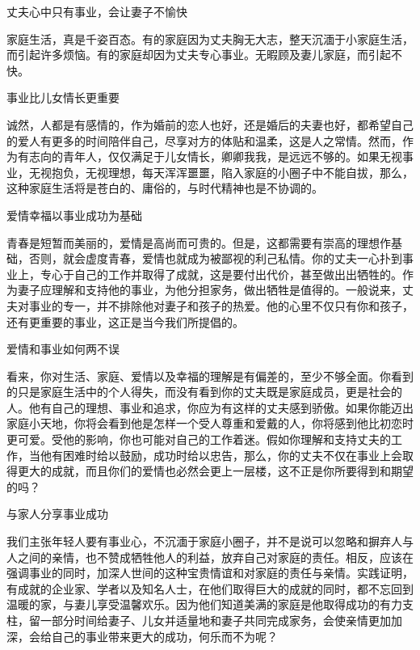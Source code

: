 \documentclass[12pt,UTF8]{ctexbook}
\begin{document}
丈夫心中只有事业，会让妻子不愉快


家庭生活，真是千姿百态。有的家庭因为丈夫胸无大志，整天沉湎于小家庭生活，而引起许多烦恼。有的家庭却因为丈夫专心事业。无暇顾及妻儿家庭，而引起不快。





事业比儿女情长更重要


诚然，人都是有感情的，作为婚前的恋人也好，还是婚后的夫妻也好，都希望自己的爱人有更多的时间陪伴自己，尽享对方的体贴和温柔，这是人之常情。然而，作为有志向的青年人，仅仅满足于儿女情长，卿卿我我，是远远不够的。如果无视事业，无视抱负，无视理想，每天浑浑噩噩，陷入家庭的小圈子中不能自拔，那么，这种家庭生活将是苍白的、庸俗的，与时代精神也是不协调的。





爱情幸福以事业成功为基础


青春是短暂而美丽的，爱情是高尚而可贵的。但是，这都需要有崇高的理想作基础，否则，就会虚度青春，爱情也就成为被鄙视的利己私情。你的丈夫一心扑到事业上，专心于自己的工作并取得了成就，这是要付出代价，甚至做出出牺牲的。作为妻子应理解和支持他的事业，为他分担家务，做出牺牲是值得的。一般说来，丈夫对事业的专一，并不排除他对妻子和孩子的热爱。他的心里不仅只有你和孩子，还有更重要的事业，这正是当今我们所提倡的。





爱情和事业如何两不误


看来，你对生活、家庭、爱情以及幸福的理解是有偏差的，至少不够全面。你看到的只是家庭生活中的个人得失，而没有看到你的丈夫既是家庭成员，更是社会的人。他有自己的理想、事业和追求，你应为有这样的丈夫感到骄傲。如果你能迈出家庭小天地，你将会看到他是怎样一个受人尊重和爱戴的人，你将感到他比初恋时更可爱。受他的影响，你也可能对自己的工作着迷。假如你理解和支持丈夫的工作，当他有困难时给以鼓励，成功时给以忠告，那么，你的丈夫不仅在事业上会取得更大的成就，而且你们的爱情也必然会更上一层楼，这不正是你所要得到和期望的吗？





与家人分享事业成功


我们主张年轻人要有事业心，不沉湎于家庭小圈子，并不是说可以忽略和摒弃人与人之间的亲情，也不赞成牺牲他人的利益，放弃自己对家庭的责任。相反，应该在强调事业的同时，加深人世间的这种宝贵情谊和对家庭的责任与亲情。实践证明，有成就的企业家、学者以及知名人士，在他们取得巨大的成就的同时，都不忘回到温暖的家，与妻儿享受温馨欢乐。因为他们知道美满的家庭是他取得成功的有力支柱，留一部分时间给妻子、儿女并适量地和妻子共同完成家务，会使亲情更加加深，会给自己的事业带来更大的成功，何乐而不为呢？
\end{document}
